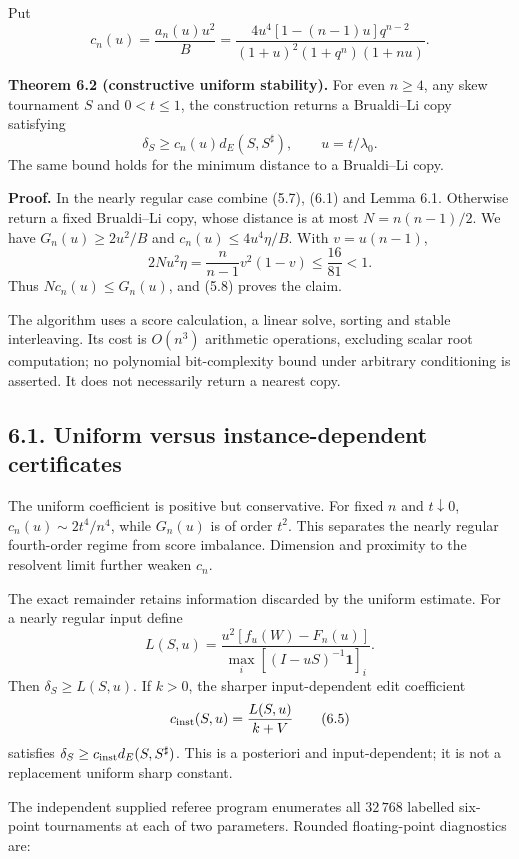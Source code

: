 \documentclass[
  11pt,
  a4paper,
]{article}
\begin{document}
Put \[
 c_n(u)=\frac{a_n(u)u^2}{B}
 =\frac{4u^4[1-(n-1)u]q^{n-2}}
 {(1+u)^2(1+q^n)(1+nu)}.                                  \tag{6.2}
\]

\textbf{Theorem 6.2 (constructive uniform stability).} For even
\(n\ge4\), any skew tournament \(S\) and \(0<t\le1\), the construction
returns a Brualdi--Li copy satisfying
\[\delta_S\ge c_n(u)d_E(S,S^\sharp),\qquad u=t/\lambda_0.    \tag{6.3}\]
The same bound holds for the minimum distance to a Brualdi--Li copy.

\textbf{Proof.} In the nearly regular case combine (5.7), (6.1) and
Lemma 6.1. Otherwise return a fixed Brualdi--Li copy, whose distance is
at most \(N=n(n-1)/2\). We have \(G_n(u)\ge2u^2/B\) and
\(c_n(u)\le4u^4\eta/B\). With \(v=u(n-1)\),
\[2Nu^2\eta=\frac n{n-1}v^2(1-v)\le\frac{16}{81}<1.\] Thus
\(Nc_n(u)\le G_n(u)\), and (5.8) proves the claim.

The algorithm uses a score calculation, a linear solve, sorting and
stable interleaving. Its cost is \(O(n^3)\) arithmetic operations,
excluding scalar root computation; no polynomial bit-complexity bound
under arbitrary conditioning is asserted. It does not necessarily return
a nearest copy.

\subsection{6.1. Uniform versus instance-dependent
certificates}\label{uniform-versus-instance-dependent-certificates}

The uniform coefficient is positive but conservative. For fixed \(n\)
and \(t\downarrow0\), \(c_n(u)\sim2t^4/n^4\), while \(G_n(u)\) is of
order \(t^2\). This separates the nearly regular fourth-order regime
from score imbalance. Dimension and proximity to the resolvent limit
further weaken \(c_n\).

The exact remainder retains information discarded by the uniform
estimate. For a nearly regular input define \[
 L(S,u)=\frac{u^2[f_u(W)-F_n(u)]}{\max_i[(I-uS)^{-1}\mathbf1]_i}.
                                                                  \tag{6.4}
\] Then \(\delta_S\ge L(S,u)\). If \(k>0\), the sharper input-dependent
edit coefficient
\[c_{\rm inst}(S,u)=\frac{L(S,u)}{k+V}                    \tag{6.5}\]
satisfies \(\delta_S\ge c_{\rm inst}d_E(S,S^\sharp)\). This is a
posteriori and input-dependent; it is not a replacement uniform sharp
constant.

The independent supplied referee program enumerates all \(32\,768\)
labelled six-point tournaments at each of two parameters. Rounded
floating-point diagnostics are:
\end{document}
